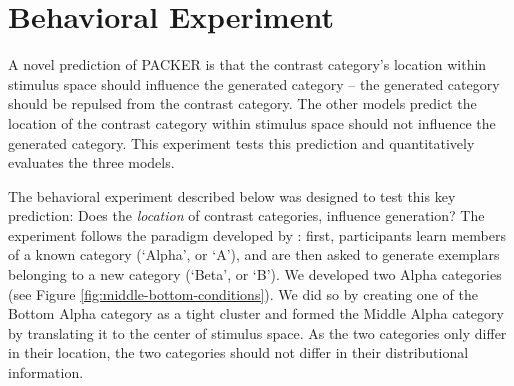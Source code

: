 \documentclass[10pt,letterpaper]{article}
\begin{document}
\section{Behavioral Experiment}
A novel prediction of PACKER is that the contrast category's location within stimulus space should influence the generated category -- the generated category should be repulsed from the contrast category. The other models predict the location of the contrast category within stimulus space should not influence the generated category. This experiment tests this prediction and quantitatively evaluates the three models.


The behavioral experiment described below was designed to test this key prediction:  Does the \textit{location} of contrast categories, influence generation? The experiment follows the paradigm developed by \citet{jern2013probabilistic}: first, participants learn members of a known category (`Alpha', or `A'), and are then asked to generate exemplars belonging to a new category (`Beta', or `B'). We developed two Alpha categories (see Figure \ref{fig:middle-bottom-conditions}). We did so by creating one of the Bottom Alpha category as a tight cluster and formed the Middle Alpha category by translating it to the center of stimulus space. As the two categories only differ in their location, the two categories should not differ in their distributional information.

\end{document}
